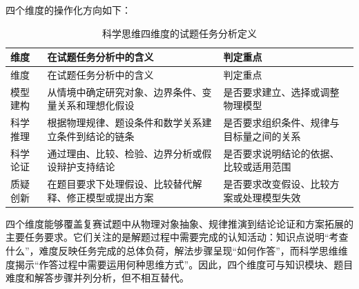 \documentclass[
  12pt,
  a4paper]{ctexbook}
\begin{document}
四个维度的操作化方向如下：

\begin{longtable}[]{@{}
  >{\raggedright\arraybackslash}p{}
  >{\raggedright\arraybackslash}p{}
  >{\raggedright\arraybackslash}p{}@{}}
\caption{科学思维四维度的试题任务分析定义}\tabularnewline
\toprule\noalign{}
\rowcolor{ThesisPale}
\begin{minipage}[b]{\linewidth}\raggedright
维度
\end{minipage} & \begin{minipage}[b]{\linewidth}\raggedright
在试题任务分析中的含义
\end{minipage} & \begin{minipage}[b]{\linewidth}\raggedright
判定重点
\end{minipage} \\
\midrule\noalign{}
\endfirsthead
\toprule\noalign{}
\rowcolor{ThesisPale}
\begin{minipage}[b]{\linewidth}\raggedright
维度
\end{minipage} & \begin{minipage}[b]{\linewidth}\raggedright
在试题任务分析中的含义
\end{minipage} & \begin{minipage}[b]{\linewidth}\raggedright
判定重点
\end{minipage} \\
\midrule\noalign{}
\endhead
\bottomrule\noalign{}
\endlastfoot
模型建构 & 从情境中确定研究对象、边界条件、变量关系和理想化假设 &
是否要求建立、选择或调整物理模型 \\
科学推理 & 根据物理规律、题设条件和数学关系建立条件到结论的链条 &
是否要求组织条件、规律与目标量之间的关系 \\
科学论证 & 通过理由、比较、检验、边界分析或假设辩护支持结论 &
是否要求说明结论的依据、比较或适用范围 \\
质疑创新 & 在题目要求下处理假设、比较替代解释、修正模型或提出方案 &
是否要求改变假设、比较方案或处理模型失效 \\
\end{longtable}

四个维度能够覆盖复赛试题中从物理对象抽象、规律推演到结论论证和方案拓展的主要任务要求。它们关注的是解题过程中需要完成的认知活动：知识点说明``考查什么''，难度反映任务完成的总体负荷，解法步骤呈现``如何作答''，而科学思维维度揭示``作答过程中需要运用何种思维方式''。因此，四个维度可与知识模块、题目难度和解答步骤并列分析，但不相互替代。
\end{document}
